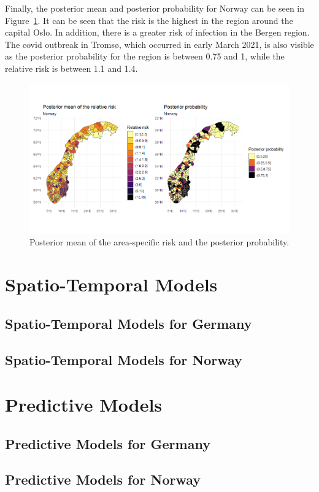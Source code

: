Finally, the posterior mean and posterior probability for Norway can be seen in Figure~\ref{posteriorNorway}. It can be seen that the risk is the highest in the region around the capital Oslo. In addition, there is a greater risk of infection in the Bergen region. The covid outbreak in Tromsø, which occurred in early March 2021, is also visible as the posterior probability for the region is between 0.75 and 1, while the relative risk is between 1.1 and 1.4.
\begin{figure}[H]
    \centering
    \includegraphics[width = \textwidth]{posterior_norway.png}
    \caption{Posterior mean of the area-specific risk and the posterior probability.}
    \label{posteriorNorway}
\end{figure}
%     
\clearpage
\section{Spatio-Temporal Models}
\subsection{Spatio-Temporal Models for Germany}
\subsection{Spatio-Temporal Models for Norway}
\section{Predictive Models}
\clearpage
\subsection{Predictive Models for Germany}
\subsection{Predictive Models for Norway}